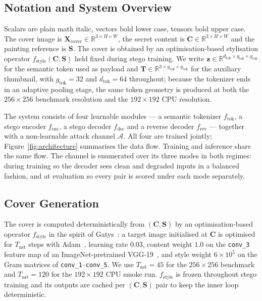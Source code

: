 \documentclass[runningheads]{llncs}
\begin{document}
\subsection{Notation and System Overview}
Scalars are plain math italic, vectors bold lower case, tensors bold upper case. The cover image is $\mathbf{X}_{\text{cover}}\!\in\!\mathbb{R}^{3\times H\times W}$, the secret content is $\mathbf{C}\!\in\!\mathbb{R}^{3\times H\times W}$ and the painting reference is $\mathbf{S}$. The cover is obtained by an optimisation-based stylisation operator $f_{\text{style}}(\mathbf{C},\mathbf{S})$ held fixed during stego training. We write $\mathbf{z}\!\in\!\mathbb{R}^{d_{\text{tok}}\times g_{\text{tok}}\times g_{\text{tok}}}$ for the semantic token used as payload and $\mathbf{T}\!\in\!\mathbb{R}^{3\times g_{\text{tok}}\times g_{\text{tok}}}$ for the auxiliary thumbnail, with $g_{\text{tok}}=32$ and $d_{\text{tok}}=64$ throughout; because the tokenizer ends in an adaptive pooling stage, the same token geometry is produced at both the $256\!\times\!256$ benchmark resolution and the $192\!\times\!192$ CPU resolution.

The system consists of four learnable modules --- a semantic tokenizer $f_{\text{tok}}$, a stego encoder $f_{\text{enc}}$, a stego decoder $f_{\text{dec}}$ and a reverse decoder $f_{\text{rev}}$ --- together with a non-learnable attack channel $\mathcal{A}$. All four are trained jointly; Figure~\ref{fig:architecture} summarises the data flow. Training and inference share the same flow. The channel is enumerated over its three modes in both regimes: during training so the decoder sees clean and degraded inputs in a balanced fashion, and at evaluation so every pair is scored under each mode separately.


\subsection{Cover Generation}
\label{sec:cover}
The cover is computed deterministically from $(\mathbf{C},\mathbf{S})$ by an optimisation-based operator $f_{\text{style}}$ in the spirit of Gatys~\cite{gatys}: a target image initialised at $\mathbf{C}$ is optimised for $T_{\text{nst}}$ steps with Adam~\cite{adam}, learning rate $0.03$, content weight $1.0$ on the \texttt{conv\_3} feature map of an ImageNet-pretrained VGG-19~\cite{vgg}, and style weight $6\!\times\!10^{5}$ on the Gram matrices of \texttt{conv\_1}--\texttt{conv\_5}. We use $T_{\text{nst}}\!=\!45$ for the $256\!\times\!256$ benchmark and $T_{\text{nst}}\!=\!120$ for the $192\!\times\!192$ CPU smoke run. $f_{\text{style}}$ is frozen throughout stego training and its outputs are cached per $(\mathbf{C},\mathbf{S})$ pair to keep the inner loop deterministic.
\end{document}
